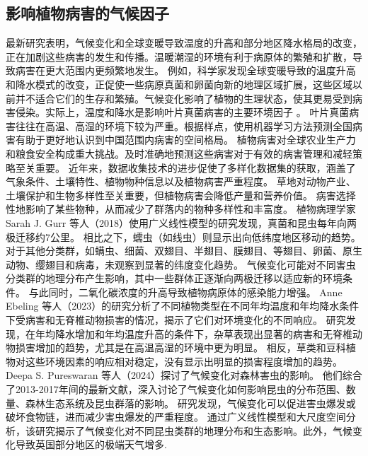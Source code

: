 \documentclass[AutoFakeBold]{LZUThesis-PgD&PhD}
\begin{document}
	\subsection{影响植物病害的气候因子}
	
	最新研究表明，气候变化和全球变暖导致温度的升高和部分地区降水格局的改变，正在加剧这些病害的发生和传播。温暖潮湿的环境有利于病原体的繁殖和扩散，导致病害在更大范围内更频繁地发生。
	例如，科学家发现全球变暖导致的温度升高和降水模式的改变，正促使一些病原真菌和卵菌向新的地理区域扩展，这些区域以前并不适合它们的生存和繁殖。气候变化影响了植物的生理状态，使其更易受到病害侵染。实际上，温度和降水是影响叶片真菌病害的主要环境因子 \citep{Chakraborty2011, Bebber2013, Garrett2006, Velasquez2018, Delgado2020}。
	叶片真菌病害往往在高温、高湿的环境下较为严重。根据样点，使用机器学习方法预测全国病害有助于更好地认识到中国范围内病害的空间格局。
	植物病害对全球农业生产力和粮食安全构成重大挑战。及时准确地预测这些病害对于有效的病害管理和减轻策略至关重要。
	近年来，数据收集技术的进步促使了多样化数据集的获取，涵盖了气象条件、土壤特性、植物物种信息以及植物病害严重程度。
	草地对动物产业、土壤保护和生物多样性至关重要，但植物病害会降低产量和营养价值\cite{chakraborty2018climate}。
	病害选择性地影响了某些物种，从而减少了群落内的物种多样性和丰富度\cite{grunberg2023impact}。
	植物病理学家 Sarah J. Gurr 等人（2018）使用广义线性模型的研究发现，真菌和昆虫每年向两极迁移约7公里。
	相比之下，蠕虫（如线虫）则显示出向低纬度地区移动的趋势。
	对于其他分类群，如螨虫、细菌、双翅目、半翅目、膜翅目、等翅目、卵菌、原生动物、缨翅目和病毒，未观察到显著的纬度变化趋势。
	气候变化可能对不同害虫分类群的地理分布产生影响，其中一些群体正逐渐向两极迁移以适应新的环境条件。
	与此同时，二氧化碳浓度的升高导致植物病原体的感染能力增强\cite{sukumar2018co2}。
	Anne Ebeling 等人（2023）的研究分析了不同植物类型在不同年均温度和年均降水条件下受病害和无脊椎动物损害的情况，揭示了它们对环境变化的不同响应。
	研究发现，在年均降水增加和年均温度升高的条件下，杂草表现出显著的病害和无脊椎动物损害增加的趋势，尤其是在高温高湿的环境中更为明显。
	相反，草类和豆科植物对这些环境因素的响应相对稳定，没有显示出明显的损害程度增加的趋势\cite{ebeling2023response}。
	Deepa S. Pureswaran 等人（2024）探讨了气候变化对森林害虫的影响。
	他们综合了2013-2017年间的最新文献，深入讨论了气候变化如何影响昆虫的分布范围、数量、森林生态系统及昆虫群落的影响。
	研究发现，气候变化可以促进害虫爆发或破坏食物链，进而减少害虫爆发的严重程度。
	通过广义线性模型和大尺度空间分析，该研究揭示了气候变化对不同昆虫类群的地理分布和生态影响。此外，气候变化导致英国部分地区的极端天气增多\cite{angelotti2024forest}.
	
\end{document}
